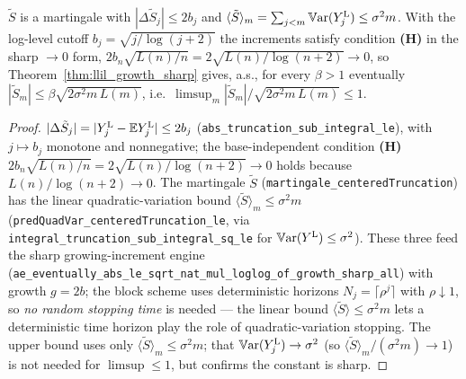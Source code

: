 \begin{lemma}\label{lem:hw_low_H}
\leanok
{}
$\tilde S$ is a martingale with $|\Delta\tilde S_j|\le2b_j$ and $\langle\tilde
S\rangle_m=\sum_{j<m}\mathbb{V}\mathrm{ar}(Y_j^{\mathrm L})\le\sigma^2 m$. With the log-level cutoff
$b_j=\sqrt{j/\log(j+2)}$ the increments satisfy condition \textbf{(H)} in the sharp
$\to0$ form, $2b_n\sqrt{L(n)/n}=2\sqrt{L(n)/\log(n+2)}\to0$, so
Theorem~\ref{thm:llil_growth_sharp} gives, a.s., for every $\beta>1$ eventually
$|\tilde S_m|\le\beta\sqrt{2\sigma^2 m\,L(m)}$, i.e.\
$\limsup_m|\tilde S_m|/\sqrt{2\sigma^2 m\,L(m)}\le1$.
\end{lemma}
\begin{proof}\leanok
$|\Delta\tilde S_j|=|Y_j^{\mathrm L}-\mathbb{E} Y_j^{\mathrm L}|\le2b_j$
(\texttt{abs\_truncation\_sub\_integral\_le}), with $j\mapsto b_j$ monotone and
nonnegative; the base-independent condition \textbf{(H)} $2b_n\sqrt{L(n)/n}=
2\sqrt{L(n)/\log(n+2)}\to0$ holds because $L(n)/\log(n+2)\to0$. The martingale $\tilde S$
(\texttt{martingale\_centeredTruncation}) has the linear quadratic-variation bound
$\langle\tilde S\rangle_m\le\sigma^2 m$ (\texttt{predQuadVar\_centeredTruncation\_le}, via
\texttt{integral\_truncation\_sub\_integral\_sq\_le} for $\mathbb{V}\mathrm{ar}(Y^{\mathrm L})\le\sigma^2$).
These three feed the sharp growing-increment engine
(\texttt{ae\_eventually\_abs\_le\_sqrt\_nat\_mul\_loglog\_of\_growth\_sharp\_all}) with growth
$g=2b$; the block scheme uses deterministic horizons $N_j=\lceil\rho^j\rceil$ with $\rho\downarrow1$,
so \emph{no random stopping time} is needed --- the linear bound $\langle\tilde S\rangle\le\sigma^2 m$
lets a deterministic time horizon play the role of quadratic-variation stopping. The upper bound uses
only $\langle\tilde S\rangle_m\le\sigma^2 m$; that $\mathbb{V}\mathrm{ar}(Y_j^{\mathrm L})\to\sigma^2$ (so
$\langle\tilde S\rangle_m/(\sigma^2 m)\to1$) is not needed for $\limsup\le1$, but confirms the
constant is sharp.
\end{proof}

